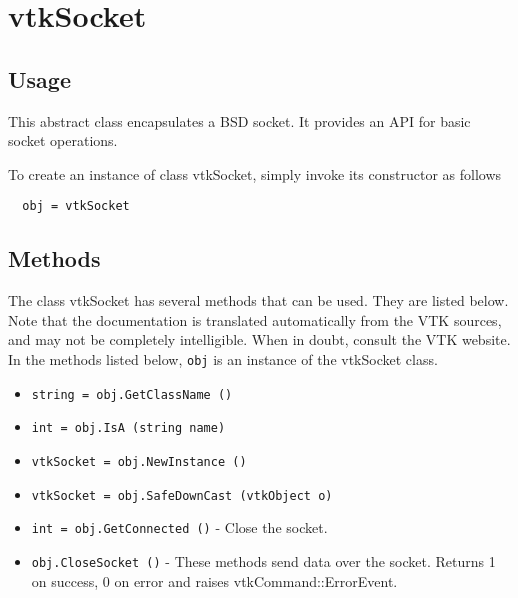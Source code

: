 \section{vtkSocket}

\subsection{Usage}

 This abstract class encapsulates a BSD socket. It provides an API for  
 basic socket operations.

To create an instance of class vtkSocket, simply
invoke its constructor as follows
\begin{verbatim}
  obj = vtkSocket
\end{verbatim}
\subsection{Methods}

The class vtkSocket has several methods that can be used.
  They are listed below.
Note that the documentation is translated automatically from the VTK sources,
and may not be completely intelligible.  When in doubt, consult the VTK website.
In the methods listed below, \verb|obj| is an instance of the vtkSocket class.
\begin{itemize}
\item  \verb|string = obj.GetClassName ()|

\item  \verb|int = obj.IsA (string name)|

\item  \verb|vtkSocket = obj.NewInstance ()|

\item  \verb|vtkSocket = obj.SafeDownCast (vtkObject o)|

\item  \verb|int = obj.GetConnected ()| -  Close the socket.

\item  \verb|obj.CloseSocket ()| -  These methods send data over the socket.
 Returns 1 on success, 0 on error and raises vtkCommand::ErrorEvent.

\end{itemize}
